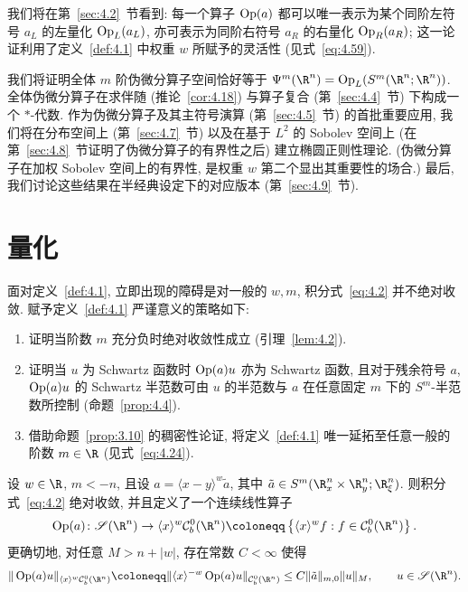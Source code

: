我们将在第~\ref{sec:4.2}~节看到: 每一个算子 $\operatorname{Op}(a)$ 都可以唯一表示为某个同阶左符号 $a_L$ 的左量化 $\operatorname{Op}_L(a_L)$, 亦可表示为同阶右符号 $a_R$ 的右量化 $\operatorname{Op}_R(a_R)$; 这一论证利用了定义~\ref{def:4.1} 中权重 $w$ 所赋予的灵活性 (见式~\eqref{eq:4.59}).

我们将证明全体 $m$ 阶伪微分算子空间恰好等于 $\Psi^m(\R^n) = \Op_L(S^m(\R^n; \R^n))$. 全体伪微分算子在求伴随 (推论~\ref{cor:4.18}) 与算子复合 (第~\ref{sec:4.4}~节) 下构成一个 $*$-代数. 作为伪微分算子及其主符号演算 (第~\ref{sec:4.5}~节) 的首批重要应用, 我们将在分布空间上 (第~\ref{sec:4.7}~节) 以及在基于 $L^2$ 的 Sobolev 空间上 (在第~\ref{sec:4.8}~节证明了伪微分算子的有界性之后) 建立椭圆正则性理论. (伪微分算子在加权 Sobolev 空间上的有界性, 是权重 $w$ 第二个显出其重要性的场合.) 最后, 我们讨论这些结果在半经典设定下的对应版本 (第~\ref{sec:4.9}~节).

\section{量化}\label{sec:4.1}
%
%
%

面对定义~\ref{def:4.1}, 立即出现的障碍是对一般的 $w, m$, 积分式~\eqref{eq:4.2} 并不绝对收敛. 赋予定义~\ref{def:4.1} 严谨意义的策略如下:
\begin{enumerate}
    \item 证明当阶数 $m$ 充分负时绝对收敛性成立 (引理~\ref{lem:4.2}).
    \item 证明当 $u$ 为 Schwartz 函数时 $\operatorname{Op}(a) u$ 亦为 Schwartz 函数, 且对于残余符号 $a$, $\operatorname{Op}(a) u$ 的 Schwartz 半范数可由 $u$ 的半范数与 $a$ 在任意固定 $m$ 下的 $S^m$-半范数所控制 (命题~\ref{prop:4.4}).
    \item 借助命题~\ref{prop:3.10} 的稠密性论证, 将定义~\ref{def:4.1} 唯一延拓至任意一般的阶数 $m \in \R$ (见式~\eqref{eq:4.24}).
\end{enumerate}

\begin{lemma}[极低阶符号的量化]\label{lem:4.2}
设 $w \in \R$, $m < -n$, 且设 $a = \langle x - y \rangle^w \tilde{a}$, 其中 $\tilde{a} \in S^m(\R_x^n \times \R_y^n; \R_\xi^n)$. 则积分式~\eqref{eq:4.2} 绝对收敛, 并且定义了一个连续线性算子
\begin{equation}\label{eq:4.6}
    \Op(a) \colon \Schwartz(\R^n) \to \langle x \rangle^w \mathcal{C}_b^0(\R^n) \defeq \left\{ \langle x \rangle^w f : f \in \mathcal{C}_b^0(\R^n) \right\}.
\end{equation}
更确切地, 对任意 $M > n + |w|$, 存在常数 $C < \infty$ 使得
\begin{equation}\label{eq:4.7}
    \|\Op(a) u\|_{\langle x \rangle^w \mathcal{C}_b^0(\R^n)} \defeq \|\langle x \rangle^{-w} \Op(a) u\|_{\mathcal{C}_b^0(\R^n)} \le C \|\tilde{a}\|_{m, 0} \|u\|_M, \qquad u \in \Schwartz(\R^n).
\end{equation}
\end{lemma}

